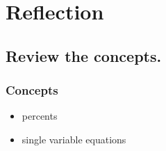 \documentclass{beamer} %
\begin{document}
\setcounter{equation}{0} %

\section{Reflection}

\subsection*{Review the concepts.}

\begin{frame}
  \frametitle{Concepts}
  \begin{itemize}
    \item percents %
    \item single variable equations
  \end{itemize}
\end{frame}
\end{document}
